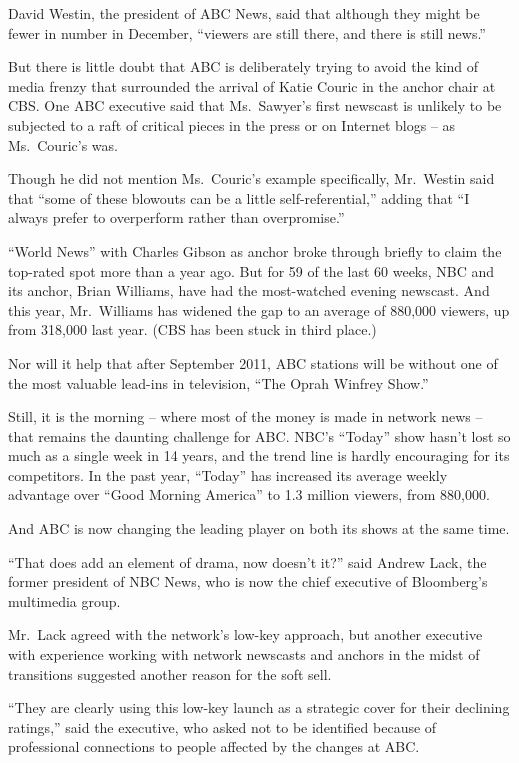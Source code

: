 ﻿\documentclass[12pt]{article}
\begin{document}
David Westin, the president of ABC News, said that although they might be fewer in number in
December, ``viewers are still there, and there is still news.''

But there is little doubt that ABC is deliberately trying to avoid the kind of media frenzy that
surrounded the arrival of Katie Couric in the anchor chair at CBS. One ABC executive said that
Ms.~Sawyer's first newscast is unlikely to be subjected to a raft of critical pieces in the press or
on Internet blogs -- as Ms.~Couric's was.

Though he did not mention Ms.~Couric's example specifically, Mr.~Westin said that ``some of these
blowouts can be a little self-referential,'' adding that ``I always prefer to overperform rather
than overpromise.''

``World News'' with Charles Gibson as anchor broke through briefly to claim the top-rated spot more
than a year ago. But for 59 of the last 60 weeks, NBC and its anchor, Brian Williams, have had the
most-watched evening newscast. And this year, Mr.~Williams has widened the gap to an average of
880,000 viewers, up from 318,000 last year. (CBS has been stuck in third place.)

Nor will it help that after September 2011, ABC stations will be without one of the most valuable
lead-ins in television, ``The Oprah Winfrey Show.''

Still, it is the morning -- where most of the money is made in network news -- that remains the
daunting challenge for ABC. NBC's ``Today'' show hasn't lost so much as a single week in 14 years,
and the trend line is hardly encouraging for its competitors. In the past year, ``Today'' has
increased its average weekly advantage over ``Good Morning America'' to 1.3 million viewers, from
880,000.

And ABC is now changing the leading player on both its shows at the same time.

``That does add an element of drama, now doesn't it?'' said Andrew Lack, the former president of NBC
News, who is now the chief executive of Bloomberg's multimedia group.

Mr.~Lack agreed with the network's low-key approach, but another executive with experience working
with network newscasts and anchors in the midst of transitions suggested another reason for the soft
sell.

``They are clearly using this low-key launch as a strategic cover for their declining ratings,''
said the executive, who asked not to be identified because of professional connections to people
affected by the changes at ABC.
\end{document}
